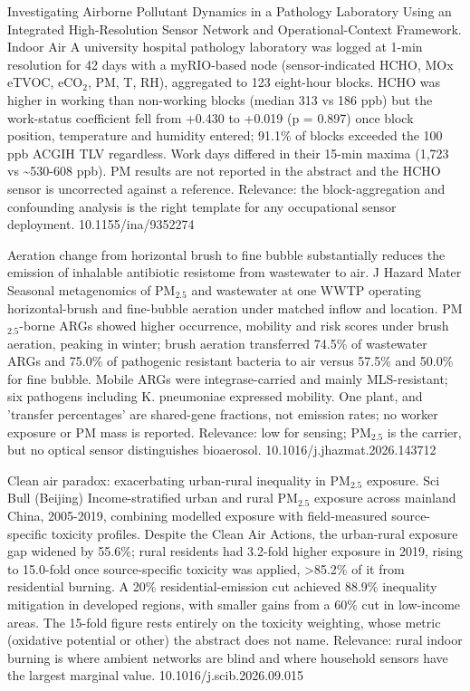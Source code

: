 \documentclass[10pt]{article}
\begin{document}
{Investigating Airborne Pollutant Dynamics in a Pathology Laboratory Using an Integrated High-Resolution Sensor Network and Operational-Context Framework.}
{Indoor Air}
{A university hospital pathology laboratory was logged at 1-min resolution for 42 days with a myRIO-based node (sensor-indicated HCHO, MOx eTVOC, eCO$_2$, PM, T, RH), aggregated to 123 eight-hour blocks. HCHO was higher in working than non-working blocks (median 313 vs 186 ppb) but the work-status coefficient fell from +0.430 to +0.019 (p = 0.897) once block position, temperature and humidity entered; 91.1\% of blocks exceeded the 100 ppb ACGIH TLV regardless. Work days differed in their 15-min maxima (1,723 vs \textasciitilde{}530-608 ppb). PM results are not reported in the abstract and the HCHO sensor is uncorrected against a reference. Relevance: the block-aggregation and confounding analysis is the right template for any occupational sensor deployment.}
{10.1155/ina/9352274}

{Aeration change from horizontal brush to fine bubble substantially reduces the emission of inhalable antibiotic resistome from wastewater to air.}
{J Hazard Mater}
{Seasonal metagenomics of PM$_{2.5}$ and wastewater at one WWTP operating horizontal-brush and fine-bubble aeration under matched inflow and location. PM$_{2.5}$-borne ARGs showed higher occurrence, mobility and risk scores under brush aeration, peaking in winter; brush aeration transferred 74.5\% of wastewater ARGs and 75.0\% of pathogenic resistant bacteria to air versus 57.5\% and 50.0\% for fine bubble. Mobile ARGs were integrase-carried and mainly MLS-resistant; six pathogens including K. pneumoniae expressed mobility. One plant, and 'transfer percentages' are shared-gene fractions, not emission rates; no worker exposure or PM mass is reported. Relevance: low for sensing; PM$_{2.5}$ is the carrier, but no optical sensor distinguishes bioaerosol.}
{10.1016/j.jhazmat.2026.143712}


{Clean air paradox: exacerbating urban-rural inequality in PM$_{2.5}$ exposure.}
{Sci Bull (Beijing)}
{Income-stratified urban and rural PM$_{2.5}$ exposure across mainland China, 2005-2019, combining modelled exposure with field-measured source-specific toxicity profiles. Despite the Clean Air Actions, the urban-rural exposure gap widened by 55.6\%; rural residents had 3.2-fold higher exposure in 2019, rising to 15.0-fold once source-specific toxicity was applied, >85.2\% of it from residential burning. A 20\% residential-emission cut achieved 88.9\% inequality mitigation in developed regions, with smaller gains from a 60\% cut in low-income areas. The 15-fold figure rests entirely on the toxicity weighting, whose metric (oxidative potential or other) the abstract does not name. Relevance: rural indoor burning is where ambient networks are blind and where household sensors have the largest marginal value.}
{10.1016/j.scib.2026.09.015}
\end{document}
